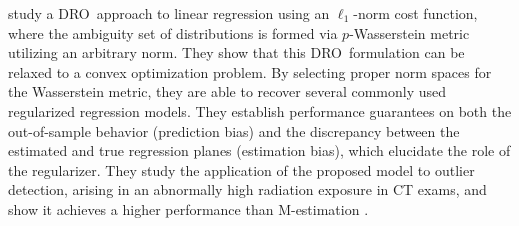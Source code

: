 \documentclass[final,onefignum,onetabnum]{class}
\newcommand{\dro}{DRO}
\begin{document}
\citet{chen2018regression} study a \dro\ approach to linear regression using an $\ell_{1}$-norm cost function, where the ambiguity set of distributions is formed via $p$-Wasserstein metric utilizing an arbitrary norm. They show that this \dro\ formulation can be relaxed to a convex optimization problem. By selecting proper norm spaces for the Wasserstein
metric, they are able to recover several commonly used regularized regression models. 
They establish performance guarantees %
on both the out-of-sample behavior (prediction bias)  and the  discrepancy between the estimated and true regression planes (estimation bias), which elucidate the role of the regularizer.
They study the  application of the proposed model to outlier detection, arising in an abnormally high radiation exposure in CT exams, and show it achieves a higher performance than M-estimation \cite{huber2009RobustStat}. %


\end{document}
